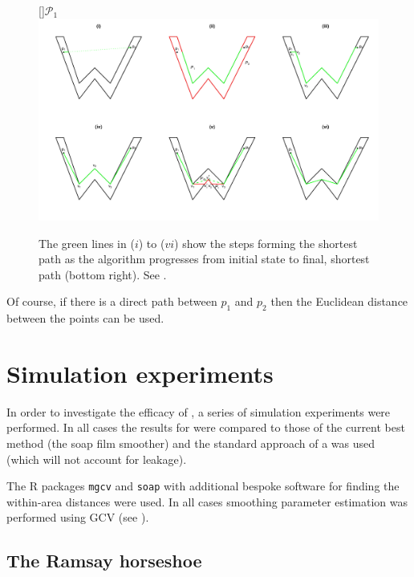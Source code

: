 \begin{figure}
\centering
[]{$\mathcal{P}_1$}
\includegraphics[trim=0in 0.5in 0in 0.25in, width=9.5in]{mds/figs/wdia.pdf} \\
\caption{The green lines in ($i$) to ($vi$) show the steps forming the shortest path as the algorithm progresses from initial state to final, shortest path (bottom right). See .}
\label{wdia}
\end{figure}

Of course, if there is a direct path between $p_1$ and $p_2$ then the Euclidean distance between the points can be used.

\section{Simulation experiments}
\label{mdssims}

In order to investigate the efficacy of \mdsap, a series of simulation experiments were performed. In all cases the results for \mdsap were compared to those of the current best method (the soap film smoother) and the standard approach of a {\tprs} was used (which will not account for leakage).

The \textsf{R} packages \texttt{mgcv} and \texttt{soap} with additional bespoke software for finding the within-area distances were used. In all cases smoothing parameter estimation was performed using GCV (see ).

\subsection{The Ramsay horseshoe}


